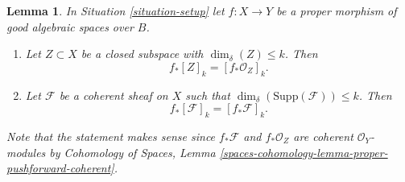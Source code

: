 \documentclass[10pt,a4paper]{amsart}
\theoremstyle{plain}
\newtheorem{lemma}[subsection]{Lemma}
\theoremstyle{definition}
\theoremstyle{remark}
\numberwithin{equation}{subsection}
\begin{document}
\begin{lemma}
\label{lemma-cycle-push-sheaf}
In Situation \ref{situation-setup} let $f : X \to Y$ be a proper morphism
of good algebraic spaces over $B$.
\begin{enumerate}
\item Let $Z \subset X$ be a closed subspace with $\dim_\delta(Z) \leq k$.
Then
$$
f_*[Z]_k = [f_*{\mathcal O}_Z]_k.
$$
\item Let $\mathcal{F}$ be a coherent sheaf on $X$ such that
$\dim_\delta(\text{Supp}(\mathcal{F})) \leq k$. Then
$$
f_*[\mathcal{F}]_k = [f_*{\mathcal F}]_k.
$$
\end{enumerate}
Note that the statement makes sense since $f_*\mathcal{F}$ and
$f_*\mathcal{O}_Z$ are coherent $\mathcal{O}_Y$-modules by
Cohomology of Spaces, Lemma
\ref{spaces-cohomology-lemma-proper-pushforward-coherent}.
\end{lemma}
\end{document}
